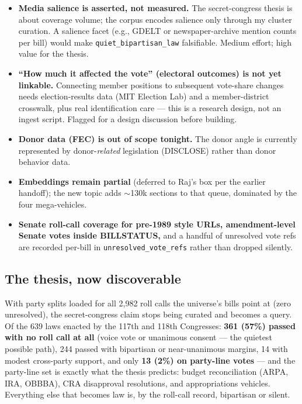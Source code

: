 \documentclass[11pt]{article}
\newcommand{\code}[1]{\texttt{#1}}
\begin{document}
\begin{itemize}[itemsep=2pt]
  \item \textbf{Media salience is asserted, not measured.} The
        secret-congress thesis is about coverage volume; the corpus
        encodes salience only through my cluster curation. A salience
        facet (e.g., GDELT or newspaper-archive mention counts per bill)
        would make \code{quiet\_bipartisan\_law} falsifiable. Medium
        effort; high value for the thesis.
  \item \textbf{``How much it affected the vote'' (electoral outcomes) is
        not yet linkable.} Connecting member positions to subsequent
        vote-share changes needs election-results data (MIT Election Lab)
        and a member-district crosswalk, plus real identification care ---
        this is a research design, not an ingest script. Flagged for a
        design discussion before building.
  \item \textbf{Donor data (FEC) is out of scope tonight.} The donor angle
        is currently represented by donor-\emph{related} legislation
        (DISCLOSE) rather than donor behavior data.
  \item \textbf{Embeddings remain partial} (deferred to Raj's box per the
        earlier handoff); the new topic adds $\sim$130k sections to that
        queue, dominated by the four mega-vehicles.
  \item \textbf{Senate roll-call coverage for pre-1989 style URLs,
        amendment-level Senate votes inside BILLSTATUS,} and a handful of
        unresolved vote refs are recorded per-bill in
        \code{unresolved\_vote\_refs} rather than dropped silently.
\end{itemize}

\subsection{The thesis, now discoverable}

With party splits loaded for all 2{,}982 roll calls the universe's bills
point at (zero unresolved), the secret-congress claim stops being
curated and becomes a query. Of the 639 laws enacted by the 117th and
118th Congresses: \textbf{361 (57\%) passed with no roll call at all}
(voice vote or unanimous consent --- the quietest possible path), 244
passed with bipartisan or near-unanimous margins, 14 with modest
cross-party support, and only \textbf{13 (2\%) on party-line votes} ---
and the party-line set is exactly what the thesis predicts: budget
reconciliation (ARPA, IRA, OBBBA), CRA disapproval resolutions, and
appropriations vehicles. Everything else that becomes law is, by the
roll-call record, bipartisan or silent.
\end{document}
